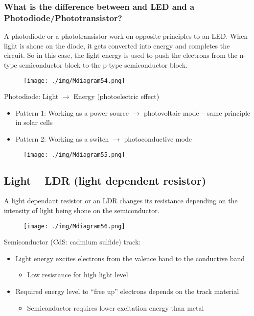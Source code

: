 \subsubsection{What is the difference between and LED and a Photodiode/Phototransistor?}
A photodiode or a phototransistor work on opposite principles to an LED. When light is shone on the diode, it gets converted into energy and completes the circuit. So in this case, the light energy is used to push the electrons from the n-type semiconductor block to the p-type semiconductor block.
\begin{figure}[H]
  \centering
  \texttt{[image: ./img/Mdiagram54.png]}
\end{figure}
Photodiode: Light $\rightarrow$ Energy (photoelectric effect)
\begin{itemize}
  \item Pattern 1: Working as a power source $\longrightarrow$ photovoltaic mode – same principle in solar cells
  \item Pattern 2: Working as a switch $\longrightarrow$ photoconductive mode
\end{itemize}
\begin{figure}[H]
  \centering
  \texttt{[image: ./img/Mdiagram55.png]}
\end{figure}
\subsection{Light – LDR (light dependent resistor)}
A light dependant resistor or an LDR changes its resistance depending on the intensity of light being shone on the semiconductor.
\begin{figure}[H]
  \centering
  \texttt{[image: ./img/Mdiagram56.png]}
\end{figure}
Semiconductor (CdS: cadmium sulfide) track:
\begin{itemize}
  \item Light energy excites electrons from the valence band to the conductive band
        \begin{itemize}
          \item Low resistance for high light level
        \end{itemize}
  \item Required energy level to “free up”
        electrons depends on the track material
        \begin{itemize}
          \item Semiconductor requires lower excitation energy than metal
        \end{itemize}
\end{itemize}
